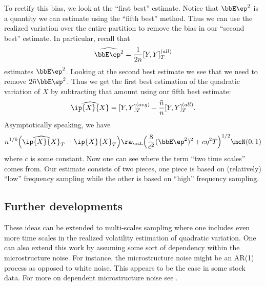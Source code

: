 \documentclass{report}
\begin{document}
To rectify this bias, we look at the ``first best'' estimate.  Notice
that $\bbE \ep^2$ is a quantity we can estimate using the ``fifth
best'' method.  Thus we can use the realized variation over the entire
partition to remove the bias in our ``second best'' estimate.  In
particular, recall that
\[
\widehat{\bbE \ep^2} = \frac{1}{2n} [Y,Y]_T^{(all)}
\]
estimates $\bbE \ep^2$.  Looking at the second best estimate we see
that we need to remove $2 \bar n \bbE \ep^2$.  Thus we get the first
best estimation of the quadratic variation of $X$ by subtracting that
amount using our fifth best estimate:
\[
\widehat{\ip{X}{X}} = [Y,Y]_T^{(avg)} - \frac{\bar n}{n}
[Y,Y]^{(all)}_T.
\]
Asymptotically speaking, we have
\[
n^{1/6} \Big( \widehat{\ip{X}{X}}_T - \ip{X}{X}_T \Big)
\ra_\mcL \Big( \frac{8}{c^2} (\bbE \ep^2)^2 + c \eta^2 T \Big)^{1/2}
\mcN(0,1)
\]
where $c$ is some constant.  Now one can see where the term ``two time
scales'' comes from.  Our estimate consists of two pieces, one piece
is based on (relatively) ``low'' frequency sampling while the other is
based on ``high'' frequency sampling.

\subsection{Further developments}

These ideas can be extended to multi-scales sampling where one
includes even more time scales in the realized volatility estimation
of quadratic variation.  One can also extend this work by assuming
some sort of dependency within the microstructure noise.  For
instance, the microstructure noise might be an AR(1) process as
opposed to white noise.  This appears to be the case in some stock
data.  For more on dependent microstructure noise see
\cite{ait-sahalia08}.

{}

\end{document}
